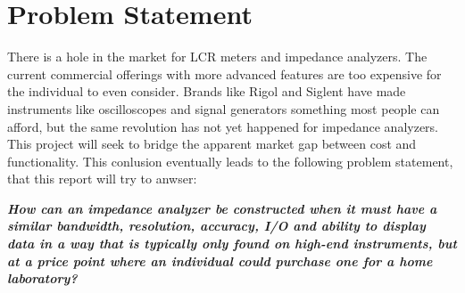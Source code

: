 \chapter{Problem Statement} \label{ch:ProblemStatement}
There is a hole in the market for LCR meters and impedance analyzers. The current commercial offerings with more advanced features are too expensive for the individual to even consider. Brands like Rigol and Siglent have made instruments like oscilloscopes and signal generators something most people can afford, but the same revolution has not yet happened for impedance analyzers. This project will seek to bridge the apparent market gap between cost and functionality. This conlusion eventually leads to the following problem statement,
that this report will try to anwser:

\textbf{\textit{How can an impedance analyzer be constructed when it must have a similar bandwidth, resolution, accuracy, I/O and ability to display data in a way that is typically only found on high-end instruments, but at a price point where an individual could purchase one for a home laboratory?}}